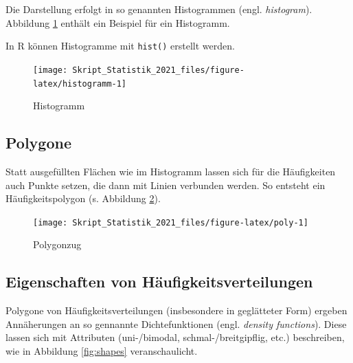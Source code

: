 \documentclass[
  11pt,
  ngerman,
  a4paper,
]{report}
\newenvironment{rtip}{
  \medskip
  \begin{tcolorbox}[colframe=purple,colback=light_gray,title=Softwarehinweis]
}{
  \end{tcolorbox}
  \medskip
}
\begin{document}
Die Darstellung erfolgt in so genannten Histogrammen (engl. \emph{histogram}). Abbildung \ref{fig:histogramm} enthält ein Beispiel für ein Histogramm.

\begin{rtip}
In R können Histogramme mit \verb|hist()| erstellt werden.
\end{rtip}

\begin{figure}[!h]

{\centering \texttt{[image: Skript\_Statistik\_2021\_files/figure-latex/histogramm-1]} 

}

\caption{Histogramm}\label{fig:histogramm}
\end{figure}

\hypertarget{polygone}{%
\subsection{Polygone}\label{polygone}}

Statt ausgefüllten Flächen wie im Histogramm lassen sich für die Häufigkeiten auch Punkte setzen, die dann mit Linien verbunden werden. So entsteht ein Häufigkeitspolygon (s. Abbildung \ref{fig:poly}).

\begin{figure}[!h]

{\centering \texttt{[image: Skript\_Statistik\_2021\_files/figure-latex/poly-1]} 

}

\caption{Polygonzug}\label{fig:poly}
\end{figure}

\hypertarget{eigenschaften-von-huxe4ufigkeitsverteilungen}{%
\subsection{Eigenschaften von Häufigkeitsverteilungen}\label{eigenschaften-von-huxe4ufigkeitsverteilungen}}

Polygone von Häufigkeitsverteilungen (insbesondere in geglätteter Form) ergeben Annäherungen an so gennannte Dichtefunktionen (engl. \emph{density functions}). Diese lassen sich mit Attributen (uni-/bimodal, schmal-/breitgipflig, etc.) beschreiben, wie in Abbildung \ref{fig:shapes} veranschaulicht.
\end{document}
